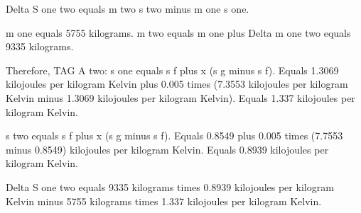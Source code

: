 Delta S one two equals m two s two minus m one s one.  

m one equals 5755 kilograms.  
m two equals m one plus Delta m one two equals 9335 kilograms.  

Therefore, TAG A two:  
s one equals s f plus x (s g minus s f).  
Equals 1.3069 kilojoules per kilogram Kelvin plus 0.005 times (7.3553 kilojoules per kilogram Kelvin minus 1.3069 kilojoules per kilogram Kelvin).  
Equals 1.337 kilojoules per kilogram Kelvin.  

s two equals s f plus x (s g minus s f).  
Equals 0.8549 plus 0.005 times (7.7553 minus 0.8549) kilojoules per kilogram Kelvin.  
Equals 0.8939 kilojoules per kilogram Kelvin.  

Delta S one two equals 9335 kilograms times 0.8939 kilojoules per kilogram Kelvin minus 5755 kilograms times 1.337 kilojoules per kilogram Kelvin.